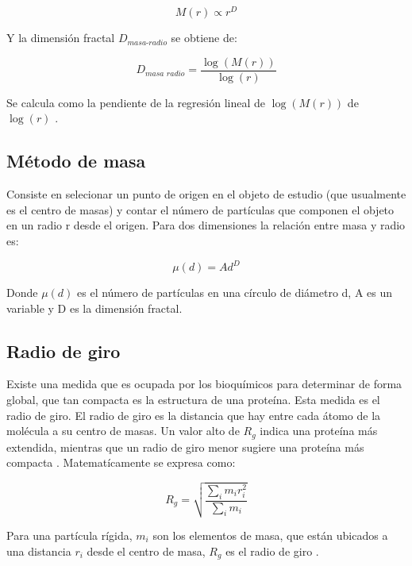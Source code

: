 \documentclass[11pt]{article}
\begin{document}
\begin{equation}
M(r) \propto r^{D} 
\end{equation}

Y la dimensi\'{o}n fractal $D_\textit{{masa-radio}}$ se obtiene de:

\begin{equation}
D_\textit{masa radio} = \frac{\log (M(r))}{\log (r)}
\end{equation}

Se calcula como la pendiente de la regresi\'{o}n lineal de $\log(M(r))$ de $\log(r)$ \cite{Mustafa1996}.


\subsection{M\'{e}todo de masa}
\label{subsec:subseccion2.5}


Consiste en selecionar un punto de
 origen en el objeto de estudio (que usualmente es el centro de masas) 
 y contar el n\'{u}mero de part\'{i}culas que componen el objeto en 
 un radio r desde el origen. Para dos dimensiones la relaci\'{o}n 
 entre masa y radio es:

\begin{equation}
\mu(d) = Ad^D
\end{equation}

Donde $\mu(d)$ es el n\'{u}mero de part\'{i}culas en una c\'{i}rculo de di\'{a}metro d, A es un variable y D es la dimensi\'{o}n fractal\cite{Mustafa1996}. 

\subsection{Radio de giro}
\label{subsec:subseccion2.6}


Existe una medida que es ocupada por los bioqu\'{i}micos para determinar de forma global, que tan compacta es la estructura de una prote\'{i}na. 
Esta medida es el radio de giro. El radio de giro es la distancia que hay entre cada \'{a}tomo de la mol\'{e}cula a 
su centro de masas. Un valor alto de $R_g$ indica una proteína más extendida, mientras que un radio de giro menor sugiere una proteína más compacta  \cite{Mroczka2012, Vicsek1992}. 
Matemat\'{i}camente se expresa como: 

\begin{equation}
R_g = \sqrt{\frac{\sum_{i} m_{i}r_{i}^{2}}{\sum_{i} m_{i}}}
\end{equation}

Para una partícula rígida, \( m_i \) son los elementos de masa, que est\'{a}n ubicados a una distancia \( r_i \) desde el centro de masa, \(R_g\) es el radio de giro \cite{IUPAC2019}.
\end{document}
